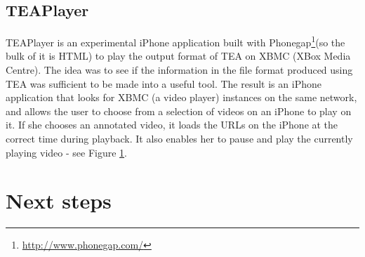 \documentclass{notube}
\begin{document}
\subsection{TEAPlayer}

TEAPlayer is an experimental iPhone application built with Phonegap\footnote{\url{http://www.phonegap.com/}}(so the bulk of it is HTML) to play the output format of TEA on XBMC (XBox Media Centre). The idea was to see if the information in the file format produced using TEA was sufficient to be made into a useful tool. The result is an iPhone application that looks for XBMC (a video player) instances on the same network, and allows the user to choose from a selection of videos on an iPhone to play on it. If she chooses an annotated video, it loads the URLs on the iPhone at the correct time during playback. It also enables her to pause and play the currently playing video - see Figure \ref{fig:teaplayer}.

\begin{figure}
{}


  \label{fig:teaplayer}
\end{figure}


\section{Next steps}
\end{document}
